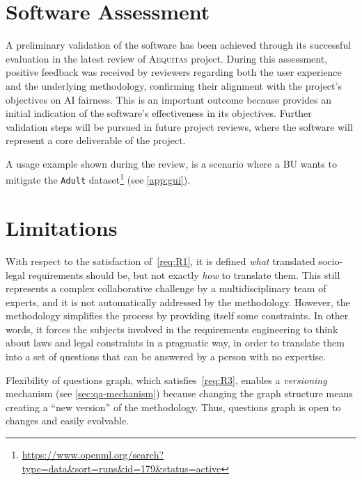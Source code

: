 \documentclass[12pt,a4paper,openright,twoside]{book}
\newcommand{\aequitas}{\textsc{Aequitas}}
\begin{document}
\section{Software Assessment}

A preliminary validation of the software has been achieved through its successful evaluation in the latest review of \aequitas{} project.
%
During this assessment, positive feedback was received by reviewers regarding both the user experience and the underlying methodology, confirming their alignment with the project’s objectives on \ac{AI} fairness.
%
This is an important outcome because provides an initial indication of the software’s effectiveness in its objectives.
%
Further validation steps will be pursued in future project reviews, where the software will represent a core deliverable of the project.

A usage example shown during the review, is a scenario where a \ac{BU} wants to mitigate the \texttt{Adult} dataset\footnote{\href{https://www.openml.org/search?type=data\&sort=runs\&id=179\&status=active}{https://www.openml.org/search?type=data\&sort=runs\&id=179\&status=active}} (see \cref{app:gui}).


\section{Limitations}

With respect to the satisfaction of~\ref{req:R1}, it is defined \textit{what} translated socio-legal requirements should be, but not exactly \textit{how} to translate them.
%
This still represents a complex collaborative challenge by a multidisciplinary team of experts, and it is not automatically addressed by the methodology.
%
However, the methodology simplifies the process by providing itself some constraints.
%
In other words, it forces the subjects involved in the requirements engineering to think about laws and legal constraints in a pragmatic way, in order to translate them into a set of questions that can be answered by a person with no expertise.


Flexibility of questions graph, which satisfies~\ref{req:R3}, enables a \textit{versioning} mechanism (see \cref{sec:qa-mechanism}) because changing the graph structure means creating a ``new version'' of the methodology.
%
Thus, questions graph is open to changes and easily evolvable.
\end{document}
